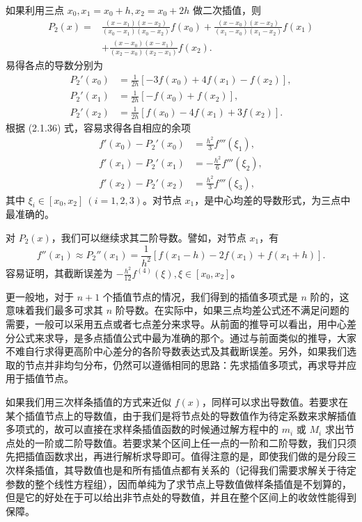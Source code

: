 如果利用三点 $x_0,x_1=x_0+h,x_2=x_0+2h$ 做二次插值，则
\[
\begin{aligned}
P_2(x)={}&\frac{(x-x_1)(x-x_2)}{(x_0-x_1)(x_0-x_2)}f(x_0)
+\frac{(x-x_0)(x-x_2)}{(x_1-x_0)(x_1-x_2)}f(x_1)\\
&+\frac{(x-x_0)(x-x_1)}{(x_2-x_0)(x_2-x_1)}f(x_2).
\end{aligned}
\]
易得各点的导数分别为
\[
\begin{aligned}
P_2'(x_0)&=\frac{1}{2h}[-3f(x_0)+4f(x_1)-f(x_2)],\\
P_2'(x_1)&=\frac{1}{2h}[-f(x_0)+f(x_2)],\\
P_2'(x_2)&=\frac{1}{2h}[f(x_0)-4f(x_1)+3f(x_2)].
\end{aligned}
\]
根据 (2.1.36) 式，容易求得各自相应的余项
\begin{align}
f'(x_0)-P_2'(x_0)&=\frac{h^2}{3}f'''(\xi_1),
\tag{2.1.40}\\
f'(x_1)-P_2'(x_1)&=-\frac{h^2}{6}f'''(\xi_2),
\tag{2.1.41}\\
f'(x_2)-P_2'(x_2)&=\frac{h^2}{3}f'''(\xi_3),
\tag{2.1.42}
\end{align}
其中 $\xi_i\in[x_0,x_2]\ (i=1,2,3)$。对节点 $x_1$，是中心均差的导数形式，为三点中最准确的。

对 $P_2(x)$，我们可以继续求其二阶导数。譬如，对节点 $x_1$，有
\begin{equation}
f''(x_1)\approx P_2''(x_1)=\frac{1}{h^2}[f(x_1-h)-2f(x_1)+f(x_1+h)].
\tag{2.1.43}
\end{equation}
容易证明，其截断误差为 $-\frac{h^2}{12}f^{(4)}(\xi),\xi\in[x_0,x_2]$。

更一般地，对于 $n+1$ 个插值节点的情况，我们得到的插值多项式是 $n$ 阶的，这意味着我们最多可求其 $n$ 阶导数。在实际中，如果三点均差公式还不满足问题的需要，一般可以采用五点或者七点差分来求导。从前面的推导可以看出，用中心差分公式来求导，是多点插值公式中最为准确的那个。通过与前面类似的推导，大家不难自行求得更高阶中心差分的各阶导数表达式及其截断误差。另外，如果我们选取的节点并非均匀分布，仍然可以遵循相同的思路：先求插值多项式，再求导并应用于插值节点。

如果我们用三次样条插值的方式来近似 $f(x)$，同样可以求出导数值。若要求在某个插值节点上的导数值，由于我们是将节点处的导数值作为待定系数来求解插值多项式的，故可以直接在求样条插值函数的时候通过解方程中的 $m_i$ 或 $M_i$ 求出节点处的一阶或二阶导数值。若要求某个区间上任一点的一阶和二阶导数，我们只须先把插值函数求出，再进行解析求导即可。值得注意的是，即使我们做的是分段三次样条插值，其导数值也是和所有插值点都有关系的（记得我们需要求解关于待定参数的整个线性方程组），因而单纯为了求节点上导数值做样条插值是不划算的，但是它的好处在于可以给出非节点处的导数值，并且在整个区间上的收敛性能得到保障。

